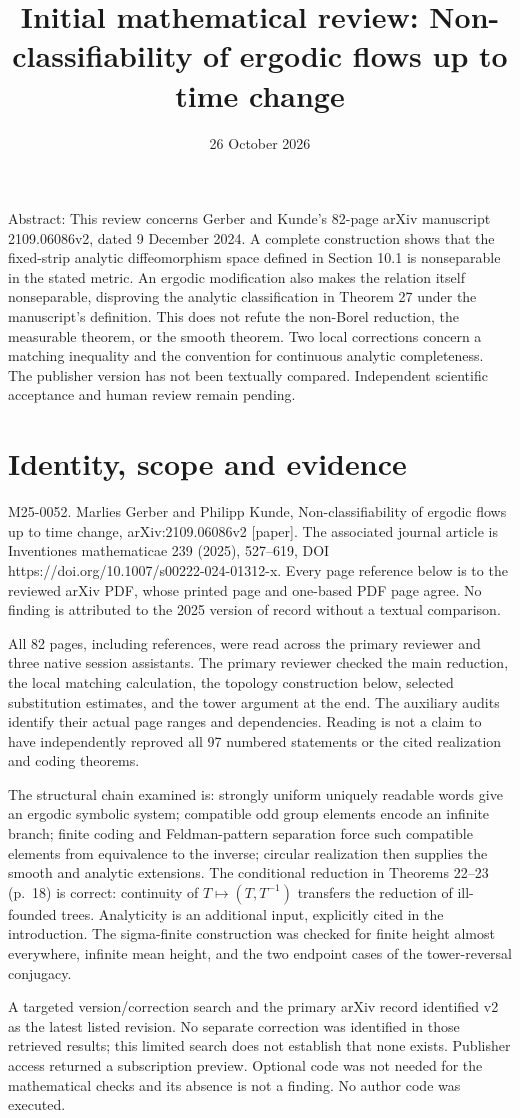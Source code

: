 \documentclass[10pt]{article}
\title{Initial mathematical review:
Non-classifiability of ergodic flows up to time change}
\author{}
\date{26 October 2026}
\begin{document}
\maketitle
Abstract: This review concerns Gerber and Kunde’s 82-page arXiv manuscript 2109.06086v2, dated 9 December 2024. A complete construction shows that the fixed-strip analytic diffeomorphism space defined in Section 10.1 is nonseparable in the stated metric. An ergodic modification also makes the relation itself nonseparable, disproving the analytic classification in Theorem 27 under the manuscript’s definition. This does not refute the non-Borel reduction, the measurable theorem, or the smooth theorem. Two local corrections concern a matching inequality and the convention for continuous analytic completeness. The publisher version has not been textually compared. Independent scientific acceptance and human review remain pending.\par
\section*{Identity, scope and evidence}
M25-0052. Marlies Gerber and Philipp Kunde, Non-classifiability of ergodic flows up to time change, arXiv:2109.06086v2 [paper]. The associated journal article is Inventiones mathematicae 239 (2025), 527–619, DOI https://doi.org/10.1007/s00222-024-01312-x. Every page reference below is to the reviewed arXiv PDF, whose printed page and one-based PDF page agree. No finding is attributed to the 2025 version of record without a textual comparison.\par
All 82 pages, including references, were read across the primary reviewer and three native session assistants. The primary reviewer checked the main reduction, the local matching calculation, the topology construction below, selected substitution estimates, and the tower argument at the end. The auxiliary audits identify their actual page ranges and dependencies. Reading is not a claim to have independently reproved all 97 numbered statements or the cited realization and coding theorems.\par
The structural chain examined is: strongly uniform uniquely readable words give an ergodic symbolic system; compatible odd group elements encode an infinite branch; finite coding and Feldman-pattern separation force such compatible elements from equivalence to the inverse; circular realization then supplies the smooth and analytic extensions. The conditional reduction in Theorems 22–23 (p. 18) is correct: continuity of \(T\mapsto(T,T^{-1})\) transfers the reduction of ill-founded trees. Analyticity is an additional input, explicitly cited in the introduction. The sigma-finite construction was checked for finite height almost everywhere, infinite mean height, and the two endpoint cases of the tower-reversal conjugacy.\par
A targeted version/correction search and the primary arXiv record identified v2 as the latest listed revision. No separate correction was identified in those retrieved results; this limited search does not establish that none exists. Publisher access returned a subscription preview. Optional code was not needed for the mathematical checks and its absence is not a finding. No author code was executed.\par
\end{document}
